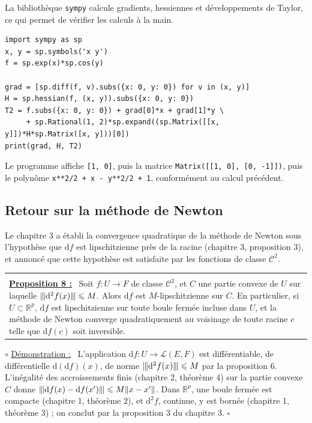\documentclass[a4paper,twoside]{report}
\makeatletter
\newenvironment{cadre}%
 {\par\vspace{2mm}\noindent\begin{tabular}{|@{\hspace{4mm}}p{0.93\textwidth}@{\hspace{4mm}}|}
  \hline \\[-2mm]}%
 {\\[2mm] \hline \end{tabular}\par\vspace{3mm}}
\newcommand{\propo}[1]{\textbf{\underline{Proposition #1 :}}~}
\newenvironment{demo}%
 {\par\needspace{4\baselineskip}\vspace{1mm}\noindent$\circ$ \underline{Démonstration :}~\setlength{\parskip}{3pt plus 1pt}}%
 {\hfill$\square$\par\vspace{2mm}}
\newcommand{\R}{\mathbb{R}}
\newcommand{\dd}{\mathrm{d}}                      %
\newcommand{\norme}[1]{\lVert #1 \rVert}         %
\newcommand{\nop}[1]{|\mkern-1.5mu|\mkern-1.5mu|#1|\mkern-1.5mu|\mkern-1.5mu|}   %
\newcommand{\Cc}{\mathcal{C}}                     %
\newcommand{\Lc}{\mathcal{L}}                     %
\makeatother
\begin{document}
La bibliothèque \texttt{sympy} calcule gradients, hessiennes et développements de Taylor, ce qui permet de vérifier les calculs à la main.

\begin{lstlisting}
import sympy as sp
x, y = sp.symbols('x y')
f = sp.exp(x)*sp.cos(y)

grad = [sp.diff(f, v).subs({x: 0, y: 0}) for v in (x, y)]
H = sp.hessian(f, (x, y)).subs({x: 0, y: 0})
T2 = f.subs({x: 0, y: 0}) + grad[0]*x + grad[1]*y \
     + sp.Rational(1, 2)*sp.expand((sp.Matrix([[x, y]])*H*sp.Matrix([x, y]))[0])
print(grad, H, T2)
\end{lstlisting}

\noindent Le programme affiche \texttt{[1, 0]}, puis la matrice \texttt{Matrix([[1, 0], [0, -1]])}, puis le polynôme \texttt{x**2/2 + x - y**2/2 + 1}, conformément au calcul précédent.

\subsection{Retour sur la méthode de Newton}

Le chapitre 3 a établi la convergence quadratique de la méthode de Newton sous l'hypothèse que $\dd f$ est lipschitzienne près de la racine (chapitre 3, proposition 3), et annoncé que cette hypothèse est satisfaite par les fonctions de classe $\Cc^{2}$.

\begin{cadre}
\propo{8} Soit $f : U \to F$ de classe $\Cc^{2}$, et $C$ une partie convexe de $U$ sur laquelle $\nop{\dd^{2} f(x)} \leqslant M$. Alors $\dd f$ est $M$-lipschitzienne sur $C$. En particulier, si $U \subset \R^{p}$, $\dd f$ est lipschitzienne sur toute boule fermée incluse dans $U$, et la méthode de Newton converge quadratiquement au voisinage de toute racine $c$ telle que $\dd f(c)$ soit inversible.
\end{cadre}

\begin{demo}
L'application $\dd f : U \to \Lc(E, F)$ est différentiable, de différentielle $\dd(\dd f)(x)$, de norme $\nop{\dd^{2} f(x)} \leqslant M$ par la proposition 6. L'inégalité des accroissements finis (chapitre 2, théorème 4) sur la partie convexe $C$ donne $\nop{\dd f(x) - \dd f(x')} \leqslant M\norme{x - x'}$. Dans $\R^{p}$, une boule fermée est compacte (chapitre 1, théorème 2), et $\dd^{2} f$, continue, y est bornée (chapitre 1, théorème 3) ; on conclut par la proposition 3 du chapitre 3.
\end{demo}
\end{document}
